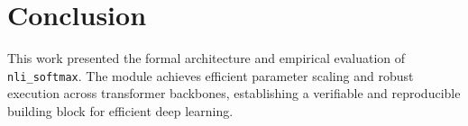 \section{Conclusion}
This work presented the formal architecture and empirical evaluation of \texttt{nli_softmax}. The module achieves efficient parameter scaling and robust execution across transformer backbones, establishing a verifiable and reproducible building block for efficient deep learning.
